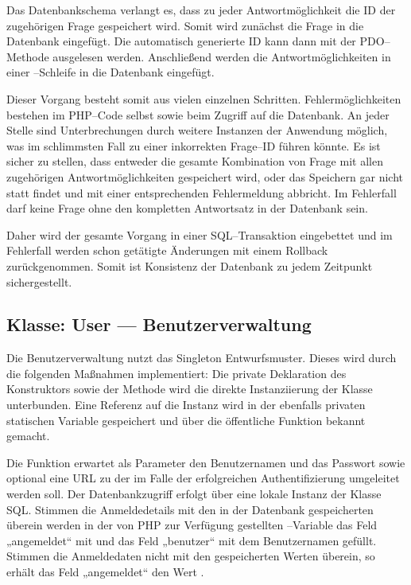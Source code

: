 Das Datenbankschema verlangt es, dass zu jeder Antwortmöglichkeit die ID der zugehörigen Frage gespeichert wird. Somit wird zunächst die Frage in die Datenbank eingefügt. Die automatisch generierte ID kann dann mit der PDO--Methode  ausgelesen werden. Anschließend werden die Antwortmöglichkeiten in einer --Schleife in die Datenbank eingefügt.

Dieser Vorgang besteht somit aus vielen einzelnen Schritten. Fehlermöglichkeiten bestehen im PHP--Code selbst sowie beim Zugriff auf die Datenbank. An jeder Stelle sind Unterbrechungen durch weitere Instanzen der Anwendung möglich, was im schlimmsten Fall zu einer inkorrekten Frage--ID führen könnte. Es ist sicher zu stellen, dass entweder die gesamte Kombination von Frage mit allen zugehörigen Antwortmöglichkeiten gespeichert wird, oder das Speichern gar nicht statt findet und mit einer entsprechenden Fehlermeldung abbricht. Im Fehlerfall darf keine Frage ohne den kompletten Antwortsatz in der Datenbank sein. 

Daher wird der gesamte Vorgang in einer SQL--Transaktion eingebettet und im Fehlerfall werden schon getätigte Änderungen mit einem Rollback zurückgenommen. Somit ist Konsistenz der Datenbank zu jedem Zeitpunkt sichergestellt.

\subsection{Klasse: User --- Benutzerverwaltung}
\label{sec:user}
Die Benutzerverwaltung nutzt das Singleton Entwurfsmuster. Dieses wird durch die folgenden Maßnahmen implementiert: Die private Deklaration des Konstruktors sowie der  Methode wird die direkte Instanziierung der Klasse unterbunden. Eine Referenz auf die Instanz wird in der ebenfalls privaten statischen Variable  gespeichert und über die öffentliche Funktion  bekannt gemacht.

Die Funktion  erwartet als Parameter den Benutzernamen und das Passwort sowie optional eine URL zu der im Falle der erfolgreichen Authentifizierung umgeleitet werden soll. Der Datenbankzugriff erfolgt über eine lokale Instanz der Klasse SQL. Stimmen die Anmeldedetails mit den in der Datenbank gespeicherten überein werden in der von PHP zur Verfügung gestellten --Variable das Feld „angemeldet“ mit  und das Feld „benutzer“ mit dem Benutzernamen gefüllt. Stimmen die Anmeldedaten nicht mit den gespeicherten Werten überein, so erhält das Feld „angemeldet“ den Wert .

